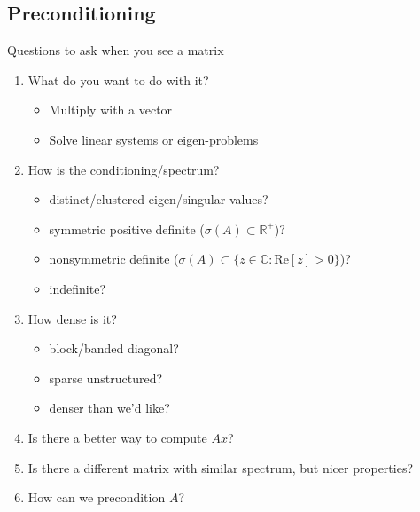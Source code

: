 \subsection{Preconditioning}



\begin{frame}{Questions to ask when you see a matrix}
  \begin{enumerate}
  \item What do you want to do with it?
    \begin{itemize}
    \item Multiply with a vector
    \item Solve linear systems or eigen-problems
    \end{itemize}
  \item How is the conditioning/spectrum?
    \begin{itemize}
    \item distinct/clustered eigen/singular values?
    \item symmetric positive definite ($\sigma(A) \subset \mathbb{R}^+$)?
    \item nonsymmetric definite ($\sigma(A) \subset \{z \in \mathbb{C} : \mathrm{Re} [z] > 0 \}$)?
    \item indefinite?
    \end{itemize}
  \item How dense is it?
    \begin{itemize}
    \item block/banded diagonal?
    \item sparse unstructured?
    \item denser than we'd like?
    \end{itemize}
  \item Is there a better way to compute $Ax$?
  \item Is there a different matrix with similar spectrum, but nicer properties?
  \item \alert<2>{How can we precondition $A$?}
  \end{enumerate}
\end{frame}



